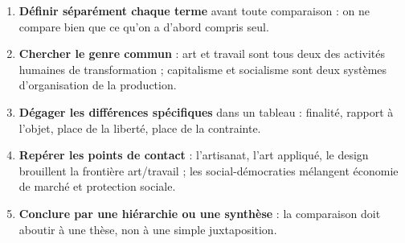 \documentclass[11pt]{article}
\begin{document}
\begin{methode}
\begin{enumerate}
\item \textbf{Définir séparément chaque terme} avant toute comparaison : on ne compare bien que ce qu'on a d'abord compris seul.
\item \textbf{Chercher le genre commun} : art et travail sont tous deux des activités humaines de transformation ; capitalisme et socialisme sont deux systèmes d'organisation de la production.
\item \textbf{Dégager les différences spécifiques} dans un tableau : finalité, rapport à l'objet, place de la liberté, place de la contrainte.
\item \textbf{Repérer les points de contact} : l'artisanat, l'art appliqué, le design brouillent la frontière art/travail ; les social-démocraties mélangent économie de marché et protection sociale.
\item \textbf{Conclure par une hiérarchie ou une synthèse} : la comparaison doit aboutir à une thèse, non à une simple juxtaposition.
\end{enumerate}
\end{methode}
\end{document}
